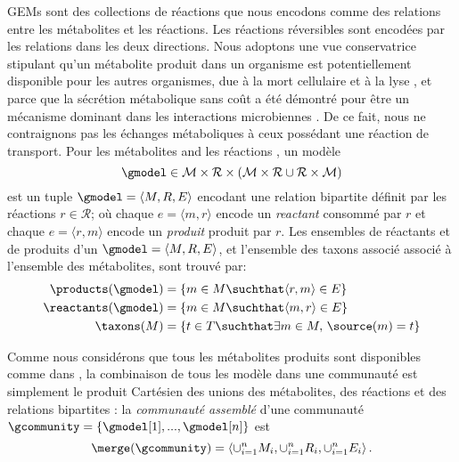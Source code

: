 GEMs sont des collections de réactions que nous encodons comme des relations entre les métabolites et les réactions. Les réactions réversibles sont encodées par les relations dans les deux directions. Nous adoptons une vue conservatrice stipulant qu'un métabolite produit dans un organisme est potentiellement disponible pour les autres organismes, due à la mort cellulaire et à la lyse \citep{Fazzino2020}, et parce que la sécrétion métabolique sans coût a été démontré pour être un mécanisme dominant dans les interactions microbiennes \citep{Pacheco.2019m3q}. De ce fait, nous ne contraignons pas les échanges métaboliques à ceux possédant une réaction de transport. Pour les métabolites \Ms and les réactions \Rs, un modèle
\[
\gmodel \in \mathcal{M} \times \mathcal{R} \times 
    (\mathcal{M} \times \mathcal{R} \cup \mathcal{R} \times \mathcal{M})
\]
est un tuple 
\(
\gmodel = \langle M, R, E \rangle
\)
encodant une relation bipartite définit par les réactions $r\in\mathcal{R}$; où chaque $e = \langle m, r \rangle$ encode un \emph{reactant} consommé par $r$ et chaque $e = \langle r, m \rangle$ encode un \emph{produit} produit par $r$.
Les ensembles de réactants et de produits d'un $\gmodel = \langle M, R, E \rangle$, et l'ensemble des taxons associé associé à l'ensemble des métabolites, sont trouvé par: 
\[
\begin{split}
    \products(\gmodel) &= \{ m\in M \suchthat \langle r, m\rangle \in E \} \\
    \reactants(\gmodel) &= \{ m\in M \suchthat \langle m, r\rangle \in E \} \\
    \taxons(M) & = \{ t \in T \suchthat \exists m\in M ,\, \source(m) = t \}
\end{split}
\]

Comme nous considérons que tous les métabolites produits sont disponibles comme dans \citep{Belcour.2020}, la combinaison de tous les modèle dans une communauté est simplement le produit Cartésien des unions des métabolites, des réactions et des relations bipartites : la \emph{communauté assemblé} d'une communauté \( \gcommunity = \{ \gmodel[1], ..., \gmodel[n] \}\)
est
\[
\merge(\gcommunity) = 
\langle \cup^{n}_{i=1} M_i, \cup^{n}_{i=1} R_i, \cup^{n}_{i=1} E_i \rangle \,.
\]

